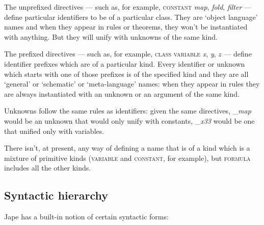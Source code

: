 The unprefixed directives --- such as, for example, \textsc{constant} \textit{map}, \textit{fold}, \textit{filter} --- define particular identifiers to be of a particular class. They are `object language' names and when they appear in rules or theorems, they won't be instantiated with anything. But they will unify with unknowns of the same kind.

The prefixed directives --- such as, for example, \textsc{class variable} \textit{x}, \textit{y}, $z$ --- define identifier prefixes which are of a particular kind. Every identifier or unknown which starts with one of those prefixes is of the specified kind and they are all `general' or `schematic' or `meta-language' names: when they appear in rules they are always instantiated with an unknown or an argument of the same kind.

Unknowns follow the same rules as identifiers: given the same directives, \_\textit{map} would be an unknown that would only unify with constants, \_\textit{x33} would be one that unified only with variables.

There isn't, at present, any way of defining a name that is of a kind which is a mixture of primitive kinds (\textsc{variable} and \textsc{constant}, for example), but \textsc{formula} includes all the other kinds.

\subsection{Syntactic hierarchy}

Jape has a built-in notion of certain syntactic forms:

